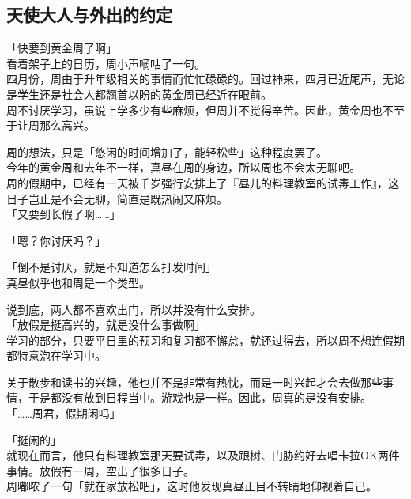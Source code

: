 \subsection{天使大人与外出的约定}

「快要到黄金周了啊」\\

看着架子上的日历，周小声嘀咕了一句。\\

四月份，周由于升年级相关的事情而忙忙碌碌的。回过神来，四月已近尾声，无论是学生还是社会人都翘首以盼的黄金周已经近在眼前。\\

周不讨厌学习，虽说上学多少有些麻烦，但周并不觉得辛苦。因此，黄金周也不至于让周那么高兴。

周的想法，只是「悠闲的时间增加了，能轻松些」这种程度罢了。\\

今年的黄金周和去年不一样，真昼在周的身边，所以周也不会太无聊吧。\\

周的假期中，已经有一天被千岁强行安排上了『昼儿的料理教室的试毒工作』，这日子岂止是不会无聊，简直是既热闹又麻烦。\\

「又要到长假了啊……」

「嗯？你讨厌吗？」

「倒不是讨厌，就是不知道怎么打发时间」\\

真昼似乎也和周是一个类型。

说到底，两人都不喜欢出门，所以并没有什么安排。\\

「放假是挺高兴的，就是没什么事做啊」\\

学习的部分，只要平日里的预习和复习都不懈怠，就还过得去，所以周不想连假期都特意泡在学习中。

关于散步和读书的兴趣，他也并不是非常有热忱，而是一时兴起才会去做那些事情，于是都没有放到日程当中。游戏也是一样。因此，周真的是没有安排。\\

「……周君，假期闲吗」

「挺闲的」\\

就现在而言，他只有料理教室那天要试毒，以及跟树、门胁约好去唱卡拉OK两件事情。放假有一周，空出了很多日子。\\

周嘟哝了一句「就在家放松吧」，这时他发现真昼正目不转睛地仰视着自己。\\

